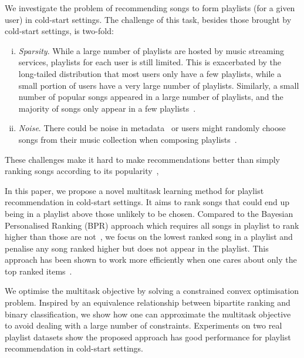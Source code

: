 We investigate the problem of recommending songs to form playlists (for a given user) in cold-start settings.
%
The challenge of this task, besides those brought by cold-start settings, is two-fold:
\begin{enumerate}[(i)]
	\item \emph{Sparsity}. While a large number of playlists are hosted by music streaming services,
playlists for each user is still limited. This is exacerbated by the long-tailed distribution that
most users only have a few playlists, while a small portion of users have a very large number of playlists.
Similarly, a small number of popular songs appeared in a large number of playlists, and the majority of songs
only appear in a few playlists~\cite{bonnin2013evaluating}.
	\item \emph{Noise}. There could be noise in metadata~\cite{bonnin2015automated} or users might randomly choose songs 
from their music collection when composing playlists~\cite{mcfee2012hypergraph}.
\end{enumerate}
These challenges make it hard to make recommendations better than simply ranking songs according to its 
popularity~\cite{mcfee2012million,bonnin2013evaluating,bonnin2015automated},


In this paper, we propose a novel multitask learning method for playlist recommendation in cold-start settings.
It aims to rank songs that could end up being in a playlist %
above those unlikely to be chosen.
Compared to the Bayesian Personalised Ranking (BPR) approach which requires all
songs in playlist to rank higher than those are not~\cite{rendle2009bpr,mcfee2012million}, 
we focus on the lowest ranked song in a playlist and penalise any song ranked higher but does not appear in the playlist.
This approach has been shown to work more efficiently when one cares about only the top ranked items~\cite{li2014top}.

We optimise the multitask objective by solving 
a constrained convex optimisation problem.
Inspired by an equivalence relationship between bipartite ranking and binary classification,
we show how one can approximate the multitask objective to avoid dealing with a large number of constraints.
Experiments on two real playlist datasets show the proposed approach 
has good performance for playlist recommendation in cold-start settings.

